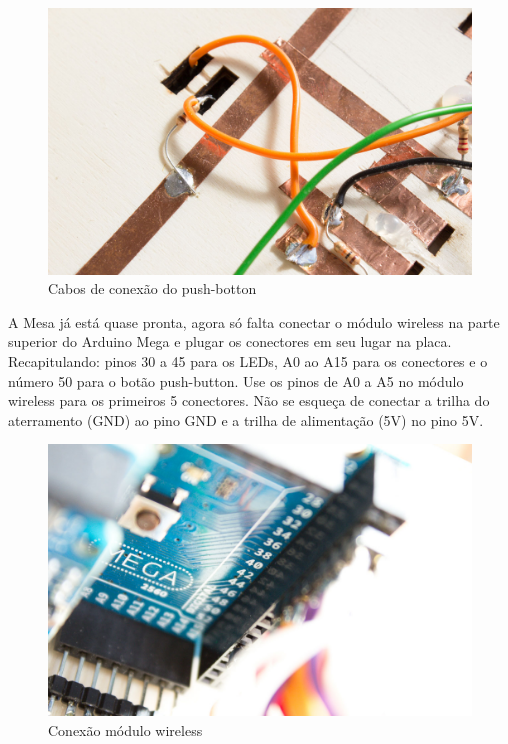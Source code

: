 \documentclass[paper=a4, fontsize=11pt]{scrartcl} %
\numberwithin{equation}{section} %
\numberwithin{figure}{section} %
\numberwithin{table}{section} %
\begin{document}
\begin{figure}[H] %
  \centering
  \includegraphics[scale=0.10]{./imagens/diy-docs-5.jpg}
  \caption[ ]{Cabos de conexão do push-botton }
  \label{fig:push-botton}
\end{figure}

A Mesa já está quase pronta, agora só falta conectar o módulo wireless na parte superior do Arduino Mega e plugar os conectores em seu lugar na placa. Recapitulando: pinos 30 a 45 para os LEDs, A0 ao A15 para os conectores e o número 50 para o botão push-button. Use os pinos de A0 a A5 no módulo wireless para os primeiros 5 conectores. Não se esqueça de conectar a trilha do aterramento (GND) ao pino GND e a trilha de alimentação (5V) no pino 5V.

\begin{figure}[h] %
  \centering
  \includegraphics[scale=0.10]{./imagens/diy-docs-3.jpg}
  \caption[ ]{Conexão módulo wireless}
  \label{fig:wifi}
\end{figure}
\end{document}
